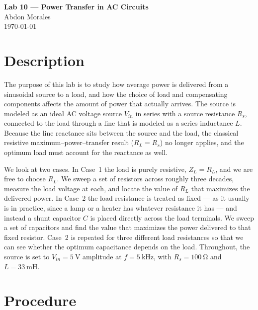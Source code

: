 \documentclass[11pt]{article}
\begin{document}
\begin{center}
    {\LARGE\bfseries Lab 10 --- Power Transfer in AC Circuits}\\[0.8em]
    {\large Abdon Morales}\\[0.3em]
    {\large \today}
\end{center}
\vspace{1em}

\section*{Description}

The purpose of this lab is to study how average power is delivered from a
sinusoidal source to a load, and how the choice of load and compensating
components affects the amount of power that actually arrives. The source is
modeled as an ideal AC voltage source $V_{in}$ in series with a source
resistance $R_s$, connected to the load through a line that is modeled as a
series inductance $L$. Because the line reactance sits between the source and
the load, the classical resistive maximum--power--transfer result
($R_L = R_s$) no longer applies, and the optimum load must account for the
reactance as well.

We look at two cases. In Case~1 the load is purely resistive, $Z_L = R_L$, and
we are free to choose $R_L$. We sweep a set of resistors across roughly three
decades, measure the load voltage at each, and locate the value of $R_L$ that
maximizes the delivered power. In Case~2 the load resistance is treated as
fixed --- as it usually is in practice, since a lamp or a heater has whatever
resistance it has --- and instead a shunt capacitor $C$ is placed directly
across the load terminals. We sweep a set of capacitors and find the value that
maximizes the power delivered to that fixed resistor. Case~2 is repeated for
three different load resistances so that we can see whether the optimum
capacitance depends on the load. Throughout, the source is set to
$V_{in} = \SI{5}{\volt}$ amplitude at $f = \SI{5}{\kilo\hertz}$, with
$R_s = \SI{100}{\ohm}$ and $L = \SI{33}{\milli\henry}$.

\section*{Procedure}
\end{document}
